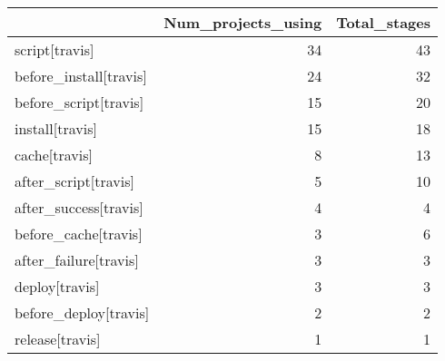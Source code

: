 \begin{tabular}{lrr}
\toprule
{} &  Num\_projects\_using &  Total\_stages \\
\midrule
script[travis]         &                  34 &            43 \\
before\_install[travis] &                  24 &            32 \\
before\_script[travis]  &                  15 &            20 \\
install[travis]        &                  15 &            18 \\
cache[travis]          &                   8 &            13 \\
after\_script[travis]   &                   5 &            10 \\
after\_success[travis]  &                   4 &             4 \\
before\_cache[travis]   &                   3 &             6 \\
after\_failure[travis]  &                   3 &             3 \\
deploy[travis]         &                   3 &             3 \\
before\_deploy[travis]  &                   2 &             2 \\
release[travis]        &                   1 &             1 \\
\bottomrule
\end{tabular}
